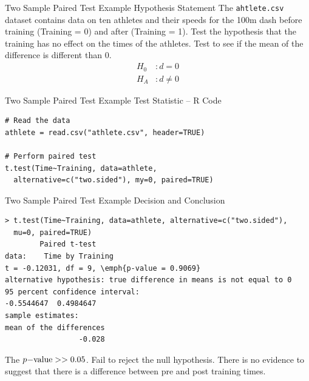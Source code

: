 \documentclass[xcolor=svgnames, 10pt, handout]{beamer}
\begin{document}
\begin{frame}[fragile]{Two Sample Paired Test Example Hypothesis Statement}
\vfill
The \verb|ahtlete.csv| dataset contains data on ten athletes and their speeds for the 100m dash before training (Training = 0) and after (Training = 1).
\vfill
Test the hypothesis that the training has no effect on the times of the athletes.  Test to see if the mean of the difference is different than 0.
\begin{align*}
H_0 &: d = 0\\
H_A &: d \neq 0
\end{align*}
\vfill
\end{frame}


\begin{frame}[fragile]{Two Sample Paired Test Example Test Statistic -- R Code}
\begin{Verbatim}[xleftmargin=2em, xrightmargin=1.5em, frame=single, label=Using CI-value, framesep=0.5em, commandchars=\\\{\}, fontsize=\small]
# Read the data
athlete = read.csv("athlete.csv", header=TRUE)

# Perform paired test
t.test(Time~Training, data=athlete, 
  alternative=c("two.sided"), my=0, paired=TRUE)
\end{Verbatim}
\end{frame}


\begin{frame}[fragile]{Two Sample Paired Test Example  Decision and Conclusion}
\begin{Verbatim}[xleftmargin=2em, xrightmargin=1.5em, frame=single, label=Using P-value, framesep=0.5em, commandchars=\\\{\}, fontsize=\footnotesize]
> t.test(Time~Training, data=athlete, alternative=c("two.sided"),
  mu=0, paired=TRUE)
        Paired t-test
data:    Time by Training
t = -0.12031, df = 9, \emph{p-value = 0.9069}
alternative hypothesis: true difference in means is not equal to 0
95 percent confidence interval:
-0.5544647  0.4984647
sample estimates:
mean of the differences
                 -0.028
\end{Verbatim}
The $p{\rm -value}>>0.05$.
\vfill
Fail to reject the null hypothesis.  There is no evidence to suggest that there is a difference between pre and post training times.
\end{frame}
\end{document}

